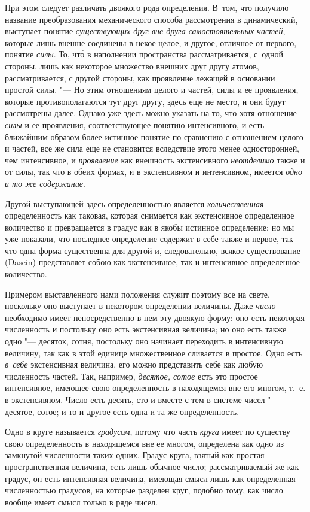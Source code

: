 При этом следует различать двоякого рода определения. В~том, что получило
название преобразования механического способа рассмотрения в динамический,
выступает понятие {\em существующих друг вне друга самостоятельных частей},
которые лишь внешне соединены в некое целое, и другое, отличное от первого,
понятие {\em силы}. То, чт\'{о} в наполнении пространства рассматривается,
с~одной стороны, лишь как некоторое множество внешних друг другу атомов,
рассматривается, с другой стороны, как проявление лежащей в основании простой
силы. "--- Но этим отношениям целого и частей, силы и ее проявления, которые
противополагаются тут друг другу, здесь еще не место, и они будут рассмотрены
далее. Однако уже здесь можно указать на то, что хотя отношение {\em силы} и ее
проявления, соответствующее понятию интенсивного, и есть ближайшим образом
более истинное понятие по сравнению с отношением целого и частей, все же сила
еще не становится вследствие этого менее односторонней, чем интенсивное, и
{\em проявление} как внешность экстенсивного {\em неотделимо} также и от силы,
так что в обеих формах, и в экстенсивном и интенсивном, имеется
{\em одно и то же содержание}.

Другой выступающей здесь определенностью является {\em количественная}
определенность как таковая, которая снимается как экстенсивное определенное
количество и превращается в градус как в якобы истинное определение; но мы уже
показали, что последнее определение содержит в себе также и первое, так что
одна форма существенна для другой и, следовательно, всякое существование
(Da\-sein) представляет собою как экстенсивное, так и интенсивное определенное
количество.

Примером выставленного нами положения служит поэтому все на свете, поскольку
оно выступает в некотором определении величины. Даже {\em число} необходимо
имеет непосредственно в нем эту двоякую форму: оно есть некоторая численность и
постольку оно есть экстенсивная величина; но оно есть также одно "--- десяток,
сотня, постольку оно начинает переходить в интенсивную величину, так как в этой
единице множественное сливается в простое. Одно есть {\em в~себе} экстенсивная
величина, его можно представить себе как любую численность частей. Так,
например, {\em десятое, сотое} есть это простое интенсивное, имеющее свою
определенность в находящемся вне его многом, т.~е. в экстенсивном. Число есть
десять, сто и вместе с тем в системе чисел "--- десятое, сотое; и то и другое
есть одна и та же определенность.

Одно в круге называется {\em градусом}, потому что часть {\em круга} имеет по
существу свою определенность в находящемся вне ее многом, определена как одно
из замкнутой численности таких одних. Градус круга, взятый как простая
пространственная величина, есть лишь обычное число; рассматриваемый же как
градус, он есть интенсивная величина, имеющая смысл лишь как определенная
численностью градусов, на которые разделен круг, подобно тому, как число вообще
имеет смысл только в ряде чисел.

